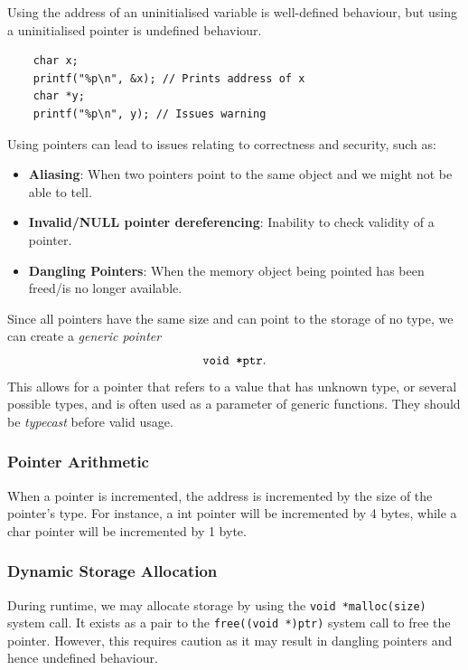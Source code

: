 \begin{remark}
  Using the address of an uninitialised variable is well-defined behaviour, but using
  a uninitialised pointer is undefined behaviour.
  \begin{lstlisting}
    char x;
    printf("%p\n", &x); // Prints address of x
    char *y;
    printf("%p\n", y); // Issues warning
  \end{lstlisting}
\end{remark}

Using pointers can lead to issues relating to correctness and security, such as:
\begin{itemize}
  \item \textbf{Aliasing}: When two pointers point to the same object and we
    might not be able to tell.
  \item \textbf{Invalid/NULL pointer dereferencing}: Inability to check validity of a pointer.
  \item \textbf{Dangling Pointers}: When the memory object being pointed has
    been freed/is no longer available.
\end{itemize}

\begin{remark}
  Since all pointers have the same size and can point to the storage of no
  type, we can create a \textit{generic pointer}
  \[\verb|void *ptr|.\]
   This allows for a pointer that refers to a value that has unknown type, or
   several possible types, and is often used as a parameter of generic
   functions. They should be \textit{typecast} before valid usage.
\end{remark}

\subsubsection{Pointer Arithmetic}
When a pointer is incremented, the address is incremented by the size of the
pointer's type. For instance, a int pointer will be incremented by 4 bytes,
while a char pointer will be incremented by 1 byte.

\subsubsection{Dynamic Storage Allocation}
During runtime, we may allocate storage by using the \verb|void *malloc(size)|
system call. It exists as a pair to the \verb|free((void *)ptr)| system call to
free the pointer. However, this requires caution as it may result in dangling
pointers and hence undefined behaviour.


